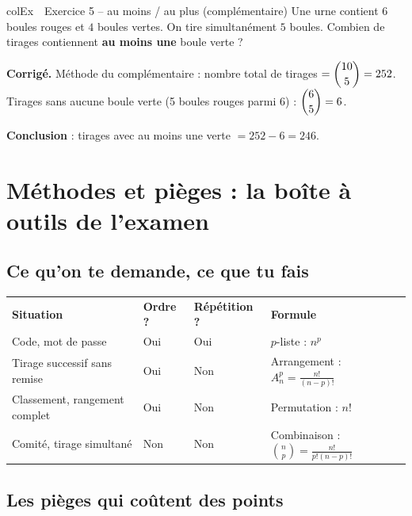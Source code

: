 \documentclass[11pt,a4paper]{article}
\newenvironment{exemple}[1][Exemple]
  {\begin{fiche}{colEx}{\ding{217}~~#1}}{\end{fiche}}
\begin{document}
\begin{exemple}[Exercice 5 -- au moins / au plus (complémentaire)]
Une urne contient $6$ boules rouges et $4$ boules vertes. On tire simultanément $5$ boules. Combien de tirages contiennent \textbf{au moins une} boule verte ?

\smallskip
\textbf{Corrigé.} Méthode du complémentaire : nombre total de tirages $=\dbinom{10}5=252$. Tirages sans aucune boule verte (5 boules rouges parmi 6) : $\dbinom65=6$.

\smallskip
\textbf{Conclusion} : tirages avec au moins une verte $=252-6=246$.
\end{exemple}

\section{Méthodes et pièges : la boîte à outils de l'examen}

\subsection{Ce qu'on te demande, ce que tu fais}

\begin{center}
\renewcommand{\arraystretch}{1.45}
\sffamily\small
\begin{tabular}{>{\raggedright\arraybackslash}p{4.6cm} >{\centering\arraybackslash}p{2cm} >{\centering\arraybackslash}p{2cm} >{\raggedright\arraybackslash}p{5.6cm}}
\rowcolor{qtealdark} \color{white}\bfseries Situation & \color{white}\bfseries Ordre ? & \color{white}\bfseries Répétition ? & \color{white}\bfseries Formule \\
\rowcolor{tealpale} Code, mot de passe & Oui & Oui & $p$-liste : $n^p$ \\
Tirage successif sans remise & Oui & Non & Arrangement : $A_n^p=\frac{n!}{(n-p)!}$ \\
\rowcolor{tealpale} Classement, rangement complet & Oui & Non & Permutation : $n!$ \\
Comité, tirage simultané & Non & Non & Combinaison : $\binom np=\frac{n!}{p!(n-p)!}$ \\
\end{tabular}
\end{center}

\subsection{Les pièges qui coûtent des points}
\end{document}
